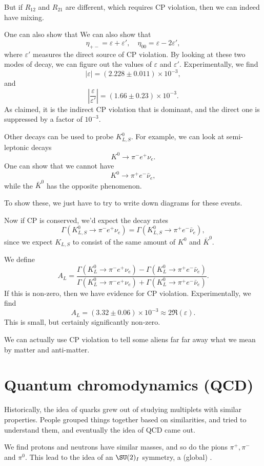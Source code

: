 \documentclass[a4paper]{article}
\begin{document}
But if $R_{12}$ and $R_{21}$ are different, which requires CP violation, then we can indeed have mixing.

One can also show that We can also show that
\[
  \eta_{+-} = \varepsilon + \varepsilon',\quad \eta_{00} = \varepsilon - 2 \varepsilon',
\]
where $\varepsilon'$ measures the direct source of CP violation. By looking at these two modes of decay, we can figure out the values of $\varepsilon$ and $\varepsilon'$. Experimentally, we find
\[
  |\varepsilon| = (2.228 \pm 0.011) \times 10^{-3},
\]
and
\[
  \left|\frac{\varepsilon}{\varepsilon'}\right| = (1.66 \pm 0.23) \times 10^{-3}.
\]
As claimed, it is the indirect CP violation that is dominant, and the direct one is suppressed by a factor of $10^{-3}$.

Other decays can be used to probe $K_{L, S}^0$. For example, we can look at semi-leptonic decays
\[
  K^0 \to \pi^- e^+ \nu_e.
\]
One can show that we cannot have
\[
  K^0 \to \pi^+ e^- \bar{\nu}_e,
\]
while the $\bar{K}^0$ has the opposite phenomenon.

To show these, we just have to try to write down diagrams for these events. %

Now if CP is conserved, we'd expect the decay rates
\[
  \Gamma(K_{L, S}^0 \to \pi^- e^+  \nu_e) = \Gamma(K_{L, S}^0 \to \pi^+ e^- \bar{\nu}_e),
\]
since we expect $K_{L, S}$ to consist of the same amount of $K^0$ and $\bar{K}^0$.

We define
\[
  A_L = \frac{\Gamma(K_L^0 \to \pi^- e^+ \nu_e) - \Gamma(K_L^0 \to \pi^+ e^- \bar{\nu}_e)}{\Gamma(K_L^0 \to \pi^- e^+ \nu_e) + \Gamma(K_L^0 \to \pi^+ e^- \bar{\nu}_e)}.
\]
If this is non-zero, then we have evidence for CP violation. Experimentally, we find
\[
  A_L = (3.32 \pm 0.06) \times 10^{-3} \approx 2 \Re (\varepsilon).
\]
This is small, but certainly significantly non-zero.

We can actually use CP violation to tell some aliens far far away what we mean by matter and anti-matter. %

\section{Quantum chromodynamics (QCD)}
Historically, the idea of quarks grew out of studying multiplets with similar properties. People grouped things together based on similarities, and tried to understand them, and eventually the idea of QCD came out.

We find protons and neutrons have similar masses, and so do the pions $\pi^+, \pi^-$ and $\pi^0$. This lead to the idea of an $\SU(2)_I$ symmetry, a (global) . 

\printindex
\end{document}
